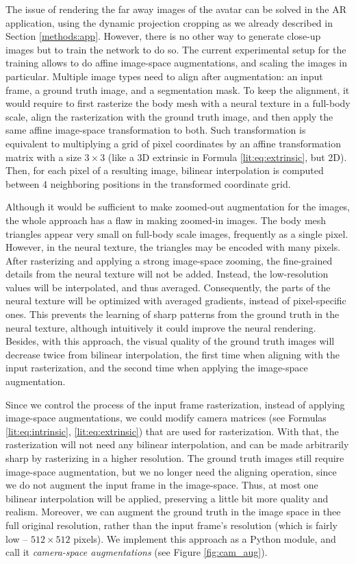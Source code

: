 The issue of rendering the far away images of the avatar can be solved in the AR application, using the dynamic projection cropping as we already described in Section \ref{methods:app}. However, there is no other way to generate close-up images but to train the network to do so. The current experimental setup for the training allows to do affine image-space augmentations, and scaling the images in particular. Multiple image types need to align after augmentation: an input frame, a ground truth image, and a segmentation mask. To keep the alignment, it would require to first rasterize the body mesh with a neural texture in a full-body scale, align the rasterization with the ground truth image, and then apply the same affine image-space transformation to both. Such transformation is equivalent to multiplying a grid of pixel coordinates by an affine transformation matrix with a size $3 \times 3$ (like a 3D extrinsic in Formula \ref{lit:eq:extrinsic}, but 2D). Then, for each pixel of a resulting image, bilinear interpolation is computed between 4 neighboring positions in the transformed coordinate grid. 

Although it would be sufficient to make zoomed-out augmentation for the images, the whole approach has a flaw in making zoomed-in images. The body mesh triangles appear very small on full-body scale images, frequently as a single pixel. However, in the neural texture, the triangles may be encoded with many pixels. After rasterizing and applying a strong image-space zooming, the fine-grained details from the neural texture will not be added. Instead, the low-resolution values will be interpolated, and thus averaged. Consequently, the parts of the neural texture will be optimized with averaged gradients, instead of pixel-specific ones. This prevents the learning of sharp patterns from the ground truth in the neural texture, although intuitively it could improve the neural rendering. Besides, with this approach, the visual quality of the ground truth images will decrease twice from bilinear interpolation, the first time when aligning with the input rasterization, and the second time when applying the image-space augmentation.

Since we control the process of the input frame rasterization, instead of applying image-space augmentations, we could modify camera matrices (see Formulas \ref{lit:eq:intrinsic}, \ref{lit:eq:extrinsic}) that are used for rasterization. With that, the rasterization will not need any bilinear interpolation, and can be made arbitrarily sharp by rasterizing in a higher resolution. The ground truth images still require image-space augmentation, but we no longer need the aligning operation, since we do not augment the input frame in the image-space. Thus, at most one bilinear interpolation will be applied, preserving a little bit more quality and realism. Moreover, we can augment the ground truth in the image space in thee full original resolution, rather than the input frame's resolution (which is fairly low -- $512 \times 512$ pixels). We implement this approach as a Python module, and call it \textit{camera-space augmentations} (see Figure \ref{fig:cam_aug}).

